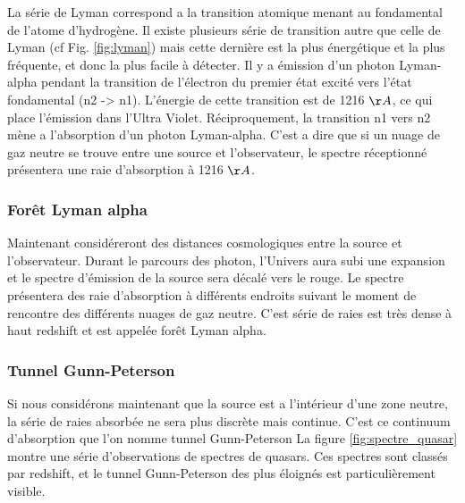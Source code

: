 La série de Lyman correspond a la transition atomique menant au fondamental de l'atome d'hydrogène.
Il existe plusieurs série de transition autre que celle de Lyman (cf Fig. \ref{fig:lyman}) mais cette dernière est la plus énergétique et la plus fréquente, et donc la plus facile à détecter.
Il y a émission d'un photon Lyman-alpha pendant la transition de l'électron du premier état excité vers l’état fondamental (n2 -> n1).
L'énergie de cette transition est de 1216 $\AA$,  ce qui place l’émission dans l'Ultra Violet.
Réciproquement, la transition n1 vers n2 mène a l'absorption d'un photon Lyman-alpha.
C'est a dire que si un nuage de gaz neutre se trouve entre une source et l'observateur, le spectre réceptionné présentera une raie d'absorption à 1216 $\AA$.

\subsubsection*{Forêt Lyman alpha}

Maintenant considéreront des distances cosmologiques entre la source et l'observateur.
Durant le parcours des photon, l'Univers aura subi une expansion et le spectre d'émission de la source sera décalé vers le rouge.
Le spectre présentera des raie d’absorption à différents endroits suivant le moment de rencontre des différents nuages de gaz neutre.
C'est série de raies est très dense à haut redshift et est appelée forêt Lyman alpha.

\subsubsection*{Tunnel Gunn-Peterson}

Si nous considérons maintenant que la source est a l’intérieur d'une zone neutre, la série de raies absorbée ne sera plus discrète mais continue.
C'est ce continuum d’absorption que l'on nomme tunnel Gunn-Peterson \cite{1965ApJ...141.1295S}
La figure \ref{fig:spectre_quasar} montre une série d'observations de spectres de quasars.
Ces spectres sont classés par redshift, et le tunnel Gunn-Peterson des plus éloignés est particulièrement visible.


